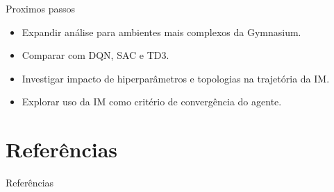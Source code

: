 \documentclass[
11pt,notheorems,hyperref={pdfauthor=Autor}
]{beamer}
\begin{document}
\begin{frame}{Proximos passos}
\begin{itemize}
    \item Expandir análise para ambientes mais complexos da Gymnasium.
    \item Comparar com DQN, SAC e TD3.
    \item Investigar impacto de hiperparâmetros e topologias na trajetória da IM.
    \item Explorar uso da IM como critério de convergência do agente.
\end{itemize}
\end{frame}

\section{Referências}
\begin{frame}[allowframebreaks]{Referências}
    \small
    \setlength{\leftmargini}{1.8em}
    \setlength{\bibitemsep}{0.25\baselineskip}
    \setlength{\bibhang}{1.0em}
    \raggedright
    \justifying
    \printbibliography
\end{frame}
\end{document}
